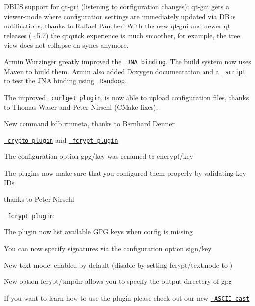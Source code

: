 \begin{DoxyItemize}
\item D\+B\+US support for qt-\/gui (listening to configuration changes)\+: qt-\/gui gets a viewer-\/mode where configuration settings are immediately updated via D\+Bus notifications, thanks to Raffael Pancheri With the new qt-\/gui and newer qt releases ($\sim$5.7) the qtquick experience is much smoother, for example, the tree view does not collapse on syncs anymore.
\item Armin Wurzinger greatly improved the \href{https://www.libelektra.org/bindings/jna}{\texttt{ J\+NA binding}}. The build system now uses Maven to build them. Armin also added Doxygen documentation and a \href{http://master.libelektra.org/scripts/randoop/randoop.in}{\texttt{ script}} to test the J\+NA binding using \href{https://randoop.github.io/randoop}{\texttt{ Randoop}}.
\item The improved \href{https://www.libelektra.org/plugins/curlget}{\texttt{ curlget plugin}}, is now able to upload configuration files, thanks to Thomas Waser and Peter Nirschl (C\+Make fixes).
\item New command {\ttfamily kdb rmmeta}, thanks to Bernhard Denner
\item \href{https://www.libelektra.org/plugins/crypto}{\texttt{ crypto plugin}} and \href{https://www.libelektra.org/plugins/fcrypt}{\texttt{ fcrypt plugin}}
\begin{DoxyItemize}
\item The configuration option {\ttfamily gpg/key} was renamed to {\ttfamily encrypt/key}
\item The plugins now make sure that you configured them properly by validating key I\+Ds
\item thanks to Peter Nirschl
\end{DoxyItemize}
\item \href{https://www.libelektra.org/plugins/fcrypt}{\texttt{ fcrypt plugin}}\+:
\begin{DoxyItemize}
\item The plugin now list available G\+PG keys when config is missing
\item You can now specify signatures via the configuration option {\ttfamily sign/key}
\item New text mode, enabled by default (disable by setting {\ttfamily fcrypt/textmode} to {})
\item New option {\ttfamily fcrypt/tmpdir} allows you to specify the output directory of {\ttfamily gpg}
\item If you want to learn how to use the plugin please check out our new \href{https://asciinema.org/a/153014}{\texttt{ A\+S\+C\+II cast}}

\end{DoxyItemize}
\end{DoxyItemize}
